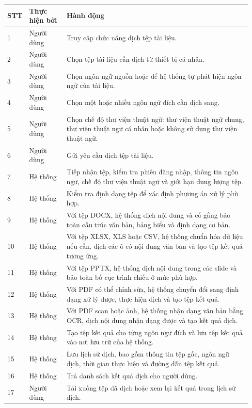 \documentclass[../DoAn.tex]{subfiles}
\begin{document}
\begin{longtable}{|p{1cm}|p{3.3cm}|p{10.2cm}|}
\hline
\textbf{STT} & \textbf{Thực hiện bởi} & \textbf{Hành động} \\ \hline
1 & Người dùng & Truy cập chức năng dịch tệp tài liệu. \\ \hline
2 & Người dùng & Chọn tệp tài liệu cần dịch từ thiết bị cá nhân. \\ \hline
3 & Người dùng & Chọn ngôn ngữ nguồn hoặc để hệ thống tự phát hiện ngôn ngữ của tài liệu. \\ \hline
4 & Người dùng & Chọn một hoặc nhiều ngôn ngữ đích cần dịch sang. \\ \hline
5 & Người dùng & Chọn chế độ thư viện thuật ngữ: thư viện thuật ngữ chung, thư viện thuật ngữ cá nhân hoặc không sử dụng thư viện thuật ngữ. \\ \hline
6 & Người dùng & Gửi yêu cầu dịch tệp tài liệu. \\ \hline
7 & Hệ thống & Tiếp nhận tệp, kiểm tra phiên đăng nhập, thông tin ngôn ngữ, chế độ thư viện thuật ngữ và giới hạn dung lượng tệp. \\ \hline
8 & Hệ thống & Kiểm tra định dạng tệp để xác định phương án xử lý phù hợp. \\ \hline
9 & Hệ thống & Với tệp DOCX, hệ thống dịch nội dung và cố gắng bảo toàn cấu trúc văn bản, bảng biểu và định dạng cơ bản. \\ \hline
10 & Hệ thống & Với tệp XLSX, XLS hoặc CSV, hệ thống chuẩn hóa dữ liệu nếu cần, dịch các ô có nội dung văn bản và tạo tệp kết quả tương ứng. \\ \hline
11 & Hệ thống & Với tệp PPTX, hệ thống dịch nội dung trong các slide và bảo toàn bố cục trình chiếu ở mức phù hợp. \\ \hline
12 & Hệ thống & Với PDF có thể chỉnh sửa, hệ thống chuyển đổi sang định dạng xử lý được, thực hiện dịch và tạo tệp kết quả. \\ \hline
13 & Hệ thống & Với PDF scan hoặc ảnh, hệ thống nhận dạng văn bản bằng OCR, dịch nội dung nhận dạng được và tạo kết quả dịch. \\ \hline
14 & Hệ thống & Tạo tệp kết quả cho từng ngôn ngữ đích và lưu tệp kết quả vào nơi lưu trữ của hệ thống. \\ \hline
15 & Hệ thống & Lưu lịch sử dịch, bao gồm thông tin tệp gốc, ngôn ngữ dịch, thời gian thực hiện và đường dẫn tệp kết quả. \\ \hline
16 & Hệ thống & Trả danh sách kết quả dịch cho người dùng. \\ \hline
17 & Người dùng & Tải xuống tệp đã dịch hoặc xem lại kết quả trong lịch sử dịch. \\ \hline
\end{longtable}
\end{document}
